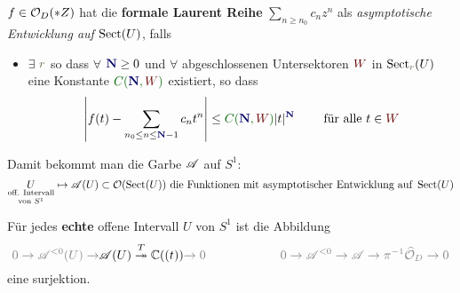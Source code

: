 \begin{defn}
  \def\myN{\textbf{\textcolor{blue!40!black}{N}}}
  \def\mySect{\textcolor{red!40!black}{W}}
  \def\myConst{\textcolor{green!40!black}{C(\myN,\mySect)}}
  $f\in\mathcal{O}_D(*Z)$ hat die \textbf{formale Laurent Reihe}
  $\sum_{n\geq n_0}c_nz^n$ als \emph{asymptotische Entwicklung auf
  $\operatorname{Sect}(U)$}, falls
  \begin{itemize}
    \item $\exists$ $\textcolor{yellow!30!black}{r}$ so dass
      $\forall$ $\myN\geq0$ und
      $\forall$ abgeschlossenen Untersektoren $\mySect$ in
      $\Sect_{\textcolor{yellow!30!black}{r}}(U)$
      \\eine Konstante $\myConst$ existiert, so dass
      \[
        \left|
          f(t)-\sum_{n_0\leq n\leq\myN-1}c_nt^n
        \right|
        \leq \myConst|t|^{\myN} \qquad \text{ für alle } t\in \mySect
      \]

      \begin{comment}
        oder äquivalent:
        $\lim_{z\to0,z\in{\mySect}}|t|^{-(\myN-1)}
          \left|
            f(t)-\sum_{n_0\leq n\leq \myN-1}c_nt^n
          \right|=0$
      \end{comment}
  \end{itemize}
  Damit bekommt man die Garbe $\mathscr{A}$ auf $S^1$:
  \[
    \underset{\text{von } S^1}{\underset{\text{off. Intervall}}{U}}
    \mapsto\mathscr{A}(U)
    \subset\mathcal{O}(\operatorname{Sect}(U)) \text{ die Funktionen mit asymptotischer
    Entwicklung auf } \operatorname{Sect}(U)
  \]
\end{defn}
\begin{llem}
  Für jedes \textbf{echte} offene Intervall $U$ von $S^1$ ist die Abbildung
  \[
    \textcolor{gray}{0\to \sA^{<0}(U) \to}
    \sA(U) \overset{T}\twoheadrightarrow \C((t))
    \textcolor{gray}{\to0}
    \qquad
    \qquad
    \qquad
    \textcolor{gray}{0\to \sA^{<0} \to
    \sA \to \pi^{-1}\hat\cO_{D}
    \to0}
  \]
  eine surjektion.
\end{llem}
